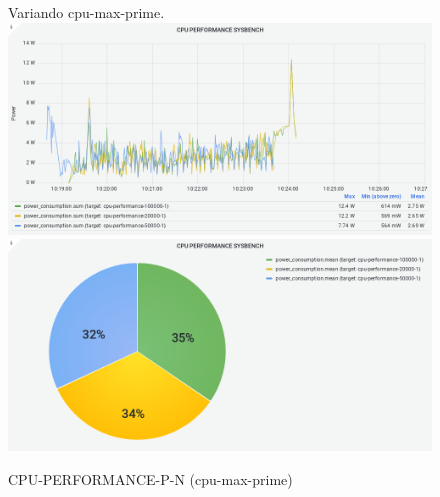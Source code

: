 \documentclass[10pt,a4paper]{article}
\begin{document}
\begin{figure}[h]
\caption{CPU-PERFORMANCE-P-N (cpu-max-prime)}
\begin{flushleft}
Variando cpu-max-prime.
\includegraphics[scale=0.4]{image8}
\includegraphics[scale=0.4]{image39}
\end{flushleft}
\end{figure}
\end{document}

